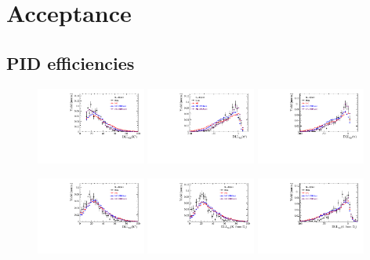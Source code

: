 \section{Acceptance}
\label{sec:Acceptance}

\subsection{PID efficiencies}

\begin{figure}[h]
\includegraphics[height=!,width=0.32\textwidth]{figs/dataVsMC/signal_pid/PID_Ds2KKpi_1_K_plus_PIDK.pdf}
\includegraphics[height=!,width=0.32\textwidth]{figs/dataVsMC/signal_pid/PID_Ds2KKpi_1_pi_plus_PIDK.pdf}
\includegraphics[height=!,width=0.32\textwidth]{figs/dataVsMC/signal_pid/PID_Ds2KKpi_1_pi_minus_PIDK.pdf}

\includegraphics[height=!,width=0.32\textwidth]{figs/dataVsMC/signal_pid/PID_Ds2KKpi_1_K_plus_fromDs_PIDK.pdf}
\includegraphics[height=!,width=0.32\textwidth]{figs/dataVsMC/signal_pid/PID_Ds2KKpi_1_K_minus_fromDs_PIDK.pdf}
\includegraphics[height=!,width=0.32\textwidth]{figs/dataVsMC/signal_pid/PID_Ds2KKpi_1_pi_minus_fromDs_PIDK.pdf}
\caption{}
\label{fig:}
\end{figure}

